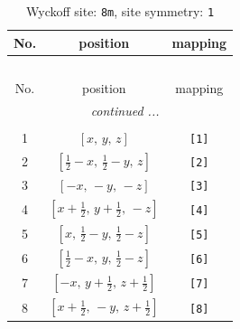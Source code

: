 \documentclass[fleqn,8pt]{jsarticle}
\begin{document}
\renewcommand{\arraystretch}{1.2}
\begin{longtable}{ccc}
\caption{Wyckoff site: {\tt 8m}, site symmetry: {\tt 1}}
 \\
 \hline \hline
No. & position & mapping \\ \hline \endfirsthead

\multicolumn{2}{l}{\tablename\ \thetable{}} \\
 \hline \hline
No. & position & mapping \\ \hline \endhead

 \hline \hline
\multicolumn{2}{r}{\footnotesize\it continued ...} \\ \endfoot

 \hline \hline
\multicolumn{2}{r}{} \\ \endlastfoot

1 & $\left[ x,\, y,\, z \right]$ & {\tt [1]} \\ \hline
2 & $\left[ \frac{1}{2} - x,\, \frac{1}{2} - y,\, z \right]$ & {\tt [2]} \\ \hline
3 & $\left[ - x,\, - y,\, - z \right]$ & {\tt [3]} \\ \hline
4 & $\left[ x + \frac{1}{2},\, y + \frac{1}{2},\, - z \right]$ & {\tt [4]} \\ \hline
5 & $\left[ x,\, \frac{1}{2} - y,\, \frac{1}{2} - z \right]$ & {\tt [5]} \\ \hline
6 & $\left[ \frac{1}{2} - x,\, y,\, \frac{1}{2} - z \right]$ & {\tt [6]} \\ \hline
7 & $\left[ - x,\, y + \frac{1}{2},\, z + \frac{1}{2} \right]$ & {\tt [7]} \\ \hline
8 & $\left[ x + \frac{1}{2},\, - y,\, z + \frac{1}{2} \right]$ & {\tt [8]} \\
\end{longtable}
\end{document}
